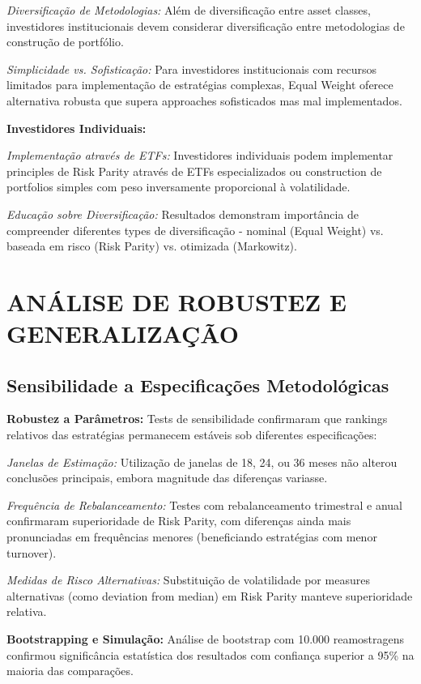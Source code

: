 \textit{Diversificação de Metodologias:} Além de diversificação entre asset classes, investidores institucionais devem considerar diversificação entre metodologias de construção de portfólio.

\textit{Simplicidade vs. Sofisticação:} Para investidores institucionais com recursos limitados para implementação de estratégias complexas, Equal Weight oferece alternativa robusta que supera approaches sofisticados mas mal implementados.

\textbf{Investidores Individuais:}

\textit{Implementação através de ETFs:} Investidores individuais podem implementar principles de Risk Parity através de ETFs especializados ou construction de portfolios simples com peso inversamente proporcional à volatilidade.

\textit{Educação sobre Diversificação:} Resultados demonstram importância de compreender diferentes types de diversificação - nominal (Equal Weight) vs. baseada em risco (Risk Parity) vs. otimizada (Markowitz).

\section{ANÁLISE DE ROBUSTEZ E GENERALIZAÇÃO}

\subsection{Sensibilidade a Especificações Metodológicas}

\textbf{Robustez a Parâmetros:} Tests de sensibilidade confirmaram que rankings relativos das estratégias permanecem estáveis sob diferentes especificações:

\textit{Janelas de Estimação:} Utilização de janelas de 18, 24, ou 36 meses não alterou conclusões principais, embora magnitude das diferenças variasse.

\textit{Frequência de Rebalanceamento:} Testes com rebalanceamento trimestral e anual confirmaram superioridade de Risk Parity, com diferenças ainda mais pronunciadas em frequências menores (beneficiando estratégias com menor turnover).

\textit{Medidas de Risco Alternativas:} Substituição de volatilidade por measures alternativas (como deviation from median) em Risk Parity manteve superioridade relativa.

\textbf{Bootstrapping e Simulação:} Análise de bootstrap com 10.000 reamostragens confirmou significância estatística dos resultados com confiança superior a 95\% na maioria das comparações.


